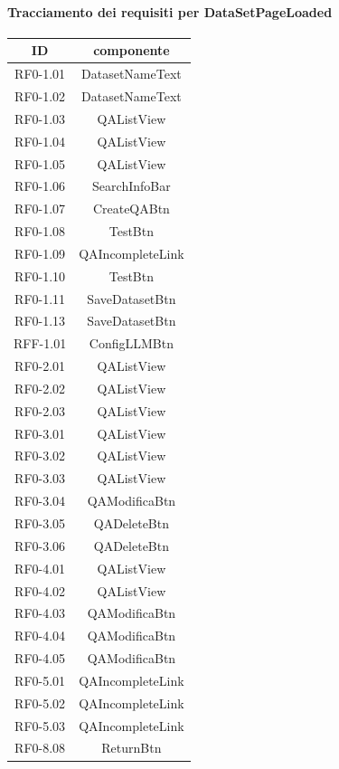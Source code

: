 \paragraph{Tracciamento dei requisiti per DataSetPageLoaded}
\begin{tabularx}{\textwidth}{|c|c|}
    \hline
    \textbf{ID} & \textbf{componente} \\
    \hline
        RF0-1.01 & DatasetNameText\\
    \hline
        RF0-1.02 & DatasetNameText\\
    \hline
        RF0-1.03 & QAListView\\
    \hline
        RF0-1.04 & QAListView\\
    \hline
        RF0-1.05 & QAListView\\
    \hline
        RF0-1.06 & SearchInfoBar\\
    \hline
        RF0-1.07 & CreateQABtn\\
    \hline
        RF0-1.08 & TestBtn\\
    \hline
        RF0-1.09 & QAIncompleteLink\\
    \hline
        RF0-1.10 & TestBtn\\
    \hline
        RF0-1.11 & SaveDatasetBtn\\
    \hline
        RF0-1.13 & SaveDatasetBtn\\
    \hline
        RFF-1.01 & ConfigLLMBtn\\ %
    \hline
        RF0-2.01 & QAListView\\
    \hline
        RF0-2.02 & QAListView\\
    \hline
        RF0-2.03 & QAListView\\
    \hline
        RF0-3.01 & QAListView\\
    \hline
        RF0-3.02 & QAListView\\
    \hline
        RF0-3.03 & QAListView\\
    \hline
        RF0-3.04 & QAModificaBtn\\
    \hline
        RF0-3.05 & QADeleteBtn\\
    \hline
        RF0-3.06 & QADeleteBtn\\
    \hline
        RF0-4.01 & QAListView\\
    \hline
        RF0-4.02 & QAListView\\
    \hline
        RF0-4.03 & QAModificaBtn\\
    \hline
        RF0-4.04 & QAModificaBtn\\
    \hline
        RF0-4.05 & QAModificaBtn\\
    \hline
        RF0-5.01 & QAIncompleteLink\\
    \hline
        RF0-5.02 & QAIncompleteLink\\
    \hline
        RF0-5.03 & QAIncompleteLink\\
    \hline
        RF0-8.08 & ReturnBtn\\
    \hline
\end{tabularx}

